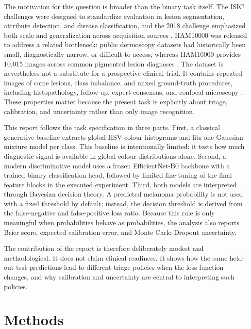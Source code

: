 \documentclass[11pt,a4paper]{article}
\begin{document}
The motivation for this question is broader than the binary task itself. The ISIC challenges were designed to standardize evaluation in lesion segmentation, attribute detection, and disease classification, and the 2018 challenge emphasized both scale and generalization across acquisition sources \citep{codella2018skin}. HAM10000 was released to address a related bottleneck: public dermoscopy datasets had historically been small, diagnostically narrow, or difficult to access, whereas HAM10000 provides 10,015 images across common pigmented lesion diagnoses \citep{tschandl2018ham10000}. The dataset is nevertheless not a substitute for a prospective clinical trial. It contains repeated images of some lesions, class imbalance, and mixed ground-truth procedures, including histopathology, follow-up, expert consensus, and confocal microscopy \citep{tschandl2018ham10000}. These properties matter because the present task is explicitly about triage, calibration, and uncertainty rather than only image recognition.

This report follows the task specification in three parts. First, a classical generative baseline extracts global HSV colour histograms and fits one Gaussian mixture model per class. This baseline is intentionally limited: it tests how much diagnostic signal is available in global colour distributions alone. Second, a modern discriminative model uses a frozen EfficientNet-B0 backbone with a trained binary classification head, followed by limited fine-tuning of the final feature blocks in the executed experiment. Third, both models are interpreted through Bayesian decision theory. A predicted melanoma probability is not used with a fixed threshold by default; instead, the decision threshold is derived from the false-negative and false-positive loss ratio. Because this rule is only meaningful when probabilities behave as probabilities, the analysis also reports Brier score, expected calibration error, and Monte Carlo Dropout uncertainty.

The contribution of the report is therefore deliberately modest and methodological. It does not claim clinical readiness. It shows how the same held-out test predictions lead to different triage policies when the loss function changes, and why calibration and uncertainty are central to interpreting such policies.

\section{Methods}
\end{document}
